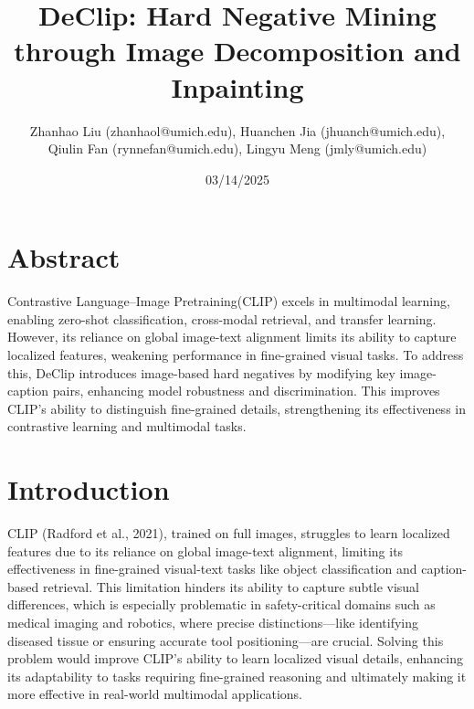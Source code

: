 \documentclass[11pt,letterpaper]{article}
\begin{document}
\title{DeClip: Hard Negative Mining through Image Decomposition and Inpainting}


\author{
Zhanhao Liu (zhanhaol@umich.edu),
Huanchen Jia (jhuanch@umich.edu),\\
Qiulin Fan (rynnefan@umich.edu),
Lingyu Meng (jmly@umich.edu)\\
}

\date{03/14/2025}


\maketitle

\section{Abstract}
Contrastive Language–Image Pretraining(CLIP) excels in multimodal learning, enabling zero-shot classification, cross-modal retrieval, and transfer learning. However, its reliance on global image-text alignment limits its ability to capture localized features, weakening performance in fine-grained visual tasks. To address this, DeClip introduces image-based hard negatives by modifying key image-caption pairs, enhancing model robustness and discrimination. This improves CLIP’s ability to distinguish fine-grained details, strengthening its effectiveness in contrastive learning and multimodal tasks.

\section{Introduction}
CLIP\cite{radford2021learningtransferablevisualmodels} (Radford et al., 2021), trained on full images, struggles to learn localized features due to its reliance on global image-text alignment, limiting its effectiveness in fine-grained visual-text tasks like object classification and caption-based retrieval. This limitation hinders its ability to capture subtle visual differences, which is especially problematic in safety-critical domains such as medical imaging and robotics, where precise distinctions—like identifying diseased tissue or ensuring accurate tool positioning—are crucial. Solving this problem would improve CLIP’s ability to learn localized visual details, enhancing its adaptability to tasks requiring fine-grained reasoning and ultimately making it more effective in real-world multimodal applications.
    



\end{document}
